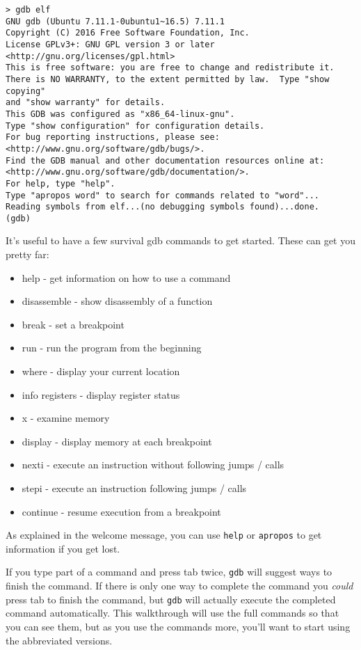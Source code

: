\begin{lstlisting}
> gdb elf
GNU gdb (Ubuntu 7.11.1-0ubuntu1~16.5) 7.11.1
Copyright (C) 2016 Free Software Foundation, Inc.
License GPLv3+: GNU GPL version 3 or later <http://gnu.org/licenses/gpl.html>
This is free software: you are free to change and redistribute it.
There is NO WARRANTY, to the extent permitted by law.  Type "show copying"
and "show warranty" for details.
This GDB was configured as "x86_64-linux-gnu".
Type "show configuration" for configuration details.
For bug reporting instructions, please see:
<http://www.gnu.org/software/gdb/bugs/>.
Find the GDB manual and other documentation resources online at:
<http://www.gnu.org/software/gdb/documentation/>.
For help, type "help".
Type "apropos word" to search for commands related to "word"...
Reading symbols from elf...(no debugging symbols found)...done.
(gdb) 
\end{lstlisting}

It's useful to have a few survival gdb commands to get started. These can get
you pretty far:

\begin{itemize}
    \item help - get information on how to use a command
    \item disassemble - show disassembly of a function
    \item break - set a breakpoint
    \item run - run the program from the beginning
    \item where - display your current location
    \item info registers - display register status
    \item x - examine memory
    \item display - display memory at each breakpoint
    \item nexti - execute an instruction without following jumps / calls
    \item stepi - execute an instruction following jumps / calls
    \item continue - resume execution from a breakpoint
\end{itemize}

As explained in the welcome message, you can use \texttt{help} or
\texttt{apropos} to get information if you get lost.

If you type part of a command and press tab twice, \texttt{gdb} will suggest
ways to finish the command. If there is only one way to complete the command you
\emph{could} press tab to finish the command, but \texttt{gdb} will actually
execute the completed command automatically. This walkthrough will use the full
commands so that you can see them, but as you use the commands more, you'll want
to start using the abbreviated versions.

